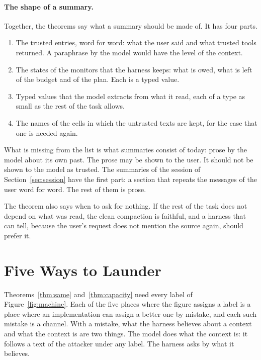 \documentclass[acmsmall,nonacm,screen]{acmart}
\begin{document}
\paragraph{The shape of a summary.} Together, the theorems say what a summary should be
made of. It has four parts.
\begin{enumerate}
\item The trusted entries, word for word: what the user said and what trusted tools returned.
  A paraphrase by the model would have the level of the context.
\item The states of the monitors that the harness keeps: what is owed, what is left of the
  budget and of the plan. Each is a typed value.
\item Typed values that the model extracts from what it read, each of a type as small as the
  rest of the task allows.
\item The names of the cells in which the untrusted texts are kept, for the case that one is
  needed again.
\end{enumerate}
What is missing from the list is what summaries consist of today: prose by the model about
its own past. The prose may be shown to the user. It should not be shown to the model as
trusted. The summaries of the session of Section~\ref{sec:session} have the first part: a
section that repeats the messages of the user word for word. The rest of them is prose.

The theorem also says when to ask for nothing. If the rest of the task does not depend on
what was read, the clean compaction is faithful, and a harness that can tell, because the
user's request does not mention the source again, should prefer it.

\section{Five Ways to Launder}
\label{sec:launder}

Theorems~\ref{thm:same} and~\ref{thm:capacity} need every label of Figure~\ref{fig:machine}.
Each of the five places where the figure assigns a label is a place where an implementation
can assign a better one by mistake, and each such mistake is a channel. With a mistake, what
the harness believes about a context and what the context is are two things. The model does
what the context is: it follows a text of the attacker under any label. The harness asks by
what it believes.
\end{document}
